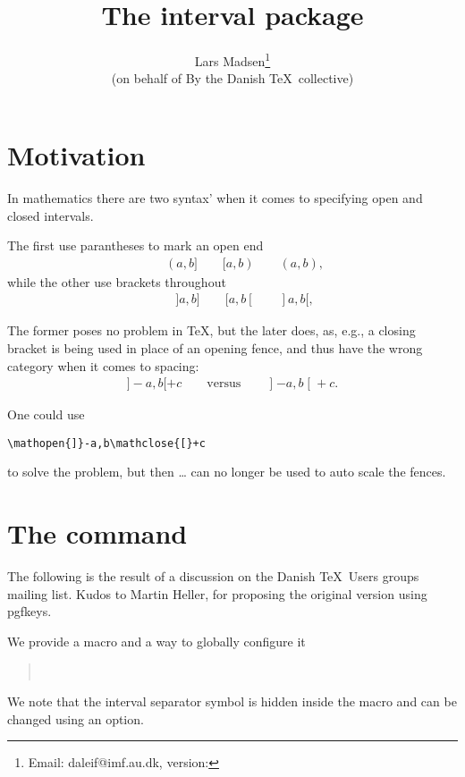 \documentclass[a4paper,article]{memoir}
\title{The \textsf{interval} package}
\author{Lars Madsen\thanks{Email: daleif@imf.au.dk, version: \INTVversion}\\ \small (on behalf of By the Danish \TeX\ collective)}
\begin{document}
\maketitle

\section{Motivation}
\label{sec:motivation}

In mathematics there are two syntax' when it comes to specifying open
and closed intervals.

The first use parantheses to mark an open end
\begin{align*}
  [a,b] \qquad (a,b] \qquad [a,b)\qquad (a,b),
\end{align*}
while the other use brackets throughout
\begin{align*}
  [a,b] \qquad ]a,b] \qquad [a,b[\qquad ]a,b[,
\end{align*}

The former poses no problem in \TeX, but the later does, as, e.g., a
closing bracket is being used in place of an opening fence, and thus
have the wrong category when it comes to spacing:
\begin{align*}
  ]-a,b[+c \qquad\text{versus}\qquad \mathopen{]}-a,b\mathclose{[}+c.
\end{align*}

One could use
\begin{verbatim}
\mathopen{]}-a,b\mathclose{[}+c
\end{verbatim}
to solve the problem, but then \dots{} can no longer
be used to auto scale the fences.




\section{The  command}
\label{sec:csinterval-command}

The following is the result of a discussion on the Danish \TeX\ Users
groups mailing list. Kudos to Martin Heller, for proposing the
original version using \textsf{pgfkeys}.

We provide a macro and a way to globally configure it
\begin{quote}
  \\
\end{quote}
We note that the interval separator symbol is hidden inside the
 macro and can be changed using an option.
\end{document}
